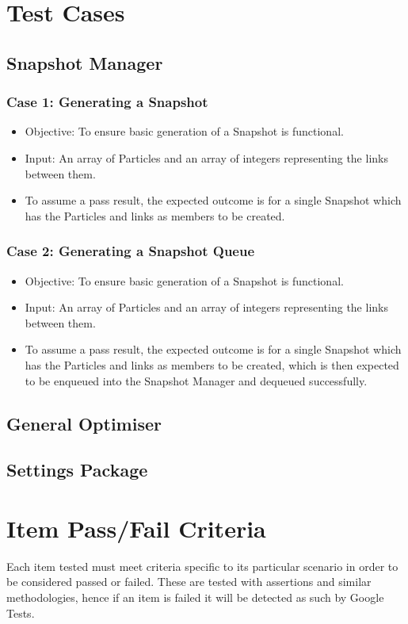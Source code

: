 \documentclass[11pt]{article}
\begin{document}
\section{Test Cases}
\subsection{Snapshot Manager}
\subsubsection{Case 1: Generating a Snapshot}
\begin{itemize}
    \item Objective: To ensure basic generation of a Snapshot is functional.
    \item Input: An array of Particles and an array of integers representing the links between them.
    \item To assume a pass result, the expected outcome is for a single Snapshot which has the Particles and links as members to be created.
\end{itemize}

\subsubsection{Case 2: Generating a Snapshot Queue}
\begin{itemize}
    \item Objective: To ensure basic generation of a Snapshot is functional.
    \item Input: An array of Particles and an array of integers representing the links between them.
    \item To assume a pass result, the expected outcome is for a single Snapshot which has the Particles and links as members to be created, which is then expected to be enqueued into the Snapshot Manager and dequeued successfully.
\end{itemize}

\subsection{General Optimiser}
\subsection{Settings Package}

\section{Item Pass/Fail Criteria}
Each item tested must meet criteria specific to its particular scenario in order to be considered passed or failed. These are tested with assertions and similar methodologies, hence if an item is failed it will be detected as such by Google Tests.
\end{document}
